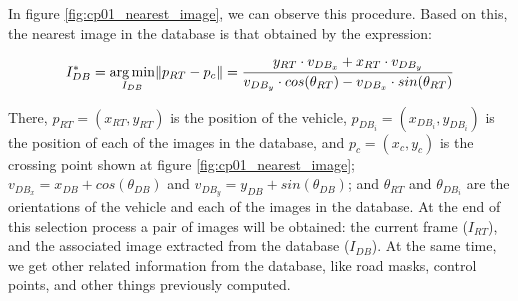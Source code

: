 In figure \ref{fig:cp01_nearest_image}, we can observe this procedure. Based on this, the nearest image in the database is that obtained by the expression:

\begin{equation}\label{eq:cp01_nearest_image}
I^*_{DB} = \underset{I_{DB}}{\arg\min} \|p_{RT} - p_c\| = {{y_{RT} \cdot v_{DB_x} + x_{RT} \cdot v_{DB_y}} \over 
  {v_{DB_y} \cdot cos(\theta_{RT}) - v_{DB_x} \cdot sin(\theta_{RT})}}
\end{equation}

There, $p_{RT} = (x_{RT}, y_{RT})$ is the position of the vehicle, $p_{DB_i} = (x_{DB_i}, y_{DB_i})$ is the position of each of the images in the database, and $p_c = (x_c, y_c)$ is the crossing point shown at figure \ref{fig:cp01_nearest_image}; $v_{DB_x} = x_{DB} + cos(\theta_{DB})$ and $v_{DB_y} = y_{DB} + sin(\theta_{DB})$; and 
$\theta_{RT}$ and $\theta_{DB_i}$ are the orientations of the vehicle and each of the images in the database. At the end of this selection process a pair of images will be obtained: the current frame ($I_{RT}$), and the associated image extracted from the database ($I_{DB}$). At the same time, we get other related information from the database, like road masks, control points, and other things previously computed.

